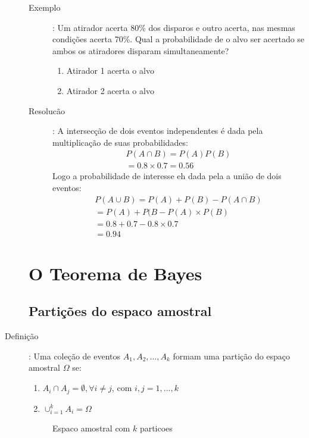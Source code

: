 \begin{description}
\begin{description}
    \item[Exemplo]: Um atirador acerta 80\% dos disparos e outro acerta, nas mesmas condições
      acerta 70\%. Qual a probabilidade de o alvo ser acertado se ambos os atiradores disparam simultaneamente?
      \begin{enumerate}[label=\Alph*:]
        \item  Atirador 1 acerta o alvo
        \item Atirador 2 acerta o alvo
      \end{enumerate}
    \item [Resolucão]:
        A intersecção de dois eventos independentes é dada pela multiplicação de suas probabilidades:
          \begin{align*}
            P(A \cap B)= P(A)P(B)\\
            =0.8 \times 0.7= 0.56
          \end{align*}
        Logo a probabilidade de interesse eh dada pela a união de dois eventos:
          \begin{align*}
            P(A \cup B)= P(A)+ P(B)- P( A \cap B )\\
            = P(A) + P(B- P(A)\times P(B)\\
            = 0.8+0.7 - 0.8\times 0.7\\
            =0.94
          \end{align*}

  \end{description}
  \section{O Teorema de Bayes}
  \subsection{Partições do espaco amostral}
\item[Definição]: Uma coleção de eventos $A_1, A_2, \ldots, A_k$ formam uma partição 
  do espaço amostral $\Omega$ se:

  \begin{enumerate}[leftmargin=*, label=\Roman*., widest=IV, align=left]
    \item $A_i \cap A_j = \emptyset, \forall i\neq j$, com $i,j =1,\ldots,k$
    \item $\cup_{i=1}^{k}A_i= \Omega$
  \end{enumerate}
  \begin{figure}[H]
    \centering
    
    \caption{Espaco amostral com $k$ particoes}
  \end{figure}
   \end{description}
